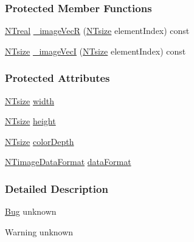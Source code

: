 \subsubsection*{Protected Member Functions}
\begin{DoxyCompactItemize}
\item 
\hyperlink{nt__types_8h_a814a97893e9deb1eedcc7604529ba80d}{NTreal} \hyperlink{class_n_t__image__o_a440ba9d220e7a28e7e130dbc050f8de6}{\_\-imageVecR} (\hyperlink{nt__types_8h_a06c124f2e4469769b58230253ce0560b}{NTsize} elementIndex) const 
\item 
\hyperlink{nt__types_8h_a06c124f2e4469769b58230253ce0560b}{NTsize} \hyperlink{class_n_t__image__o_a2ba1d8c36ea300d3fd7a0a99deaad599}{\_\-imageVecI} (\hyperlink{nt__types_8h_a06c124f2e4469769b58230253ce0560b}{NTsize} elementIndex) const 
\end{DoxyCompactItemize}
\subsubsection*{Protected Attributes}
\begin{DoxyCompactItemize}
\item 
\hyperlink{nt__types_8h_a06c124f2e4469769b58230253ce0560b}{NTsize} \hyperlink{class_n_t__image__o_af1a2f06cb8db6d36520e72df08c133d0}{width}
\item 
\hyperlink{nt__types_8h_a06c124f2e4469769b58230253ce0560b}{NTsize} \hyperlink{class_n_t__image__o_a025b7e7250470e53dbf69ba10c013284}{height}
\item 
\hyperlink{nt__types_8h_a06c124f2e4469769b58230253ce0560b}{NTsize} \hyperlink{class_n_t__image__o_ae4d50a45ce73f956ba47f493ecadb611}{colorDepth}
\item 
\hyperlink{nt__codes_8h_ad1bb9d54b61901f8e764e6cf0694e52f}{NTimageDataFormat} \hyperlink{class_n_t__image__o_ab497908a0ca93b8a0ab6dc927fa7679c}{dataFormat}
\end{DoxyCompactItemize}


\subsubsection{Detailed Description}
\begin{Desc}
\item[\hyperlink{bug__bug000101}{Bug}]unknown \end{Desc}
\begin{DoxyWarning}{Warning}
unknown 
\end{DoxyWarning}


